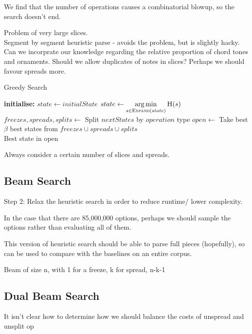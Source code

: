 \documentclass[12pt,a4paper,twoside,openright]{report}
\DeclareMathOperator*{\argmin}{arg\,min}
\theoremstyle{definition}
\begin{document}
We find that the number of operations causes a combinatorial blowup, so the search doesn't end.

Problem of very large slices.\\ 
Segment by segment heuristic parse - avoids the problem, but is slightly hacky. Can we incorprate our knowledge regarding the relative proportion of chord tones and ornaments. Should we allow duplicates of notes in slices? Perhaps we should favour spreads more. 

\begin{algorithm}[h]
  \caption{Greedy Search}
    \label{code:stbs0}
    \begin{algorithmic}
    \State \textbf{initialise: } $state \gets initialState$
    \State $state \gets \argmin\limits_{s \in \Call{Expand}{state}} \Call{H}{s} $
    \State $freezes, spreads, splits \gets $ Split $nextStates$ by $operation$ type
    \State $open \gets $ Take best $\beta$ best states from $freezes \cup spreads \cup splits$
    \EndWhile \\
    \Return Best state in open
  \end{algorithmic}
\end{algorithm}

Always consider a certain number of slices and spreads.

\subsection{Beam Search}
Step 2: Relax the heuristic search in order to reduce runtime/ lower complexity.
\par 
In the case that there are 85,000,000 options, perhaps we should sample the options rather than evaluating all of them. 
\par 
This version of heuristic search should be able to parse full pieces (hopefully), so can be used to compare with the baselines on an entire corpus.
\par 
Beam of size n, with 1 for a freeze, k for spread, n-k-1 

\subsection{Dual Beam Search}
It isn't clear how to determine how we should balance the costs of unspread and unsplit op
\end{document}
